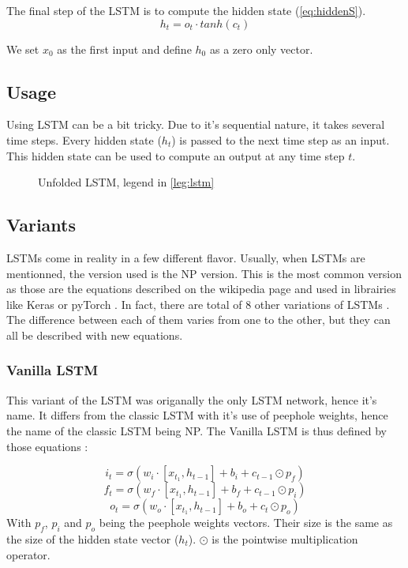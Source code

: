 The final step of the \ac{LSTM} is to compute the hidden state (\cref{eq:hiddenS}).
\begin{equation}\label{eq:hiddenS}
  h_t=o_t\cdot tanh(c_t)
\end{equation}

We set $x_0$ as the first input and define $h_0$ as a zero only vector.

\subsection{Usage}

Using \ac{LSTM} can be a bit tricky. Due to it's sequential nature, it takes several time steps. Every hidden state ($h_t$) is passed to the next time step as an input. This hidden state can be used to compute an output at any time step $t$.

\begin{figure}[H]
  \centering
  
  \caption{Unfolded \acs{LSTM}, legend in \cref{leg:lstm}}
  \label{fig:lstmUse}
\end{figure}

\subsection{Variants}

\acp{LSTM} come in reality in a few different flavor. Usually, when \acp{LSTM} are mentionned, the version used is the \ac{NP} version. This is the most common version as those are the equations described on the wikipedia page \cite{wikiLSTM} and used in librairies like Keras \cite{Keras} or pyTorch \cite{PyTorch}. In fact, there are total of 8 other variations of \acp{LSTM} \cite{nbLSTM}.
The difference between each of them varies from one to the other, but they can all be described with new equations.

\subsubsection{Vanilla \ac{LSTM}}
This variant of the \ac{LSTM} was origanally the only \ac{LSTM} network, hence it's name. It differs from the classic \ac{LSTM} with it's use of peephole weights, hence the name of the classic \ac{LSTM} being \acl{NP}. The Vanilla \ac{LSTM} is thus defined by those equations \cite{vanillaLSTM, nbLSTM} :

\begin{equation}\label{eq:inputGVanilla}
  i_t=\sigma (w_i\cdot[x_{t_1},h_{t-1}] + b_i+c_{t-1}\odot p_f)
\end{equation}
\begin{equation}\label{eq:forgetGVanilla}
  f_t=\sigma (w_f\cdot[x_{t_1},h_{t-1}] + b_f+c_{t-1}\odot p_i)
\end{equation}
\begin{equation}\label{eq:ouputGVanilla}
  o_t=\sigma (w_o\cdot[x_{t_1},h_{t-1}] + b_o+c_{t}\odot p_o)
\end{equation}
With $p_f$, $p_i$ and $p_o$ being the peephole weights vectors. Their size is the same as the size of the hidden state vector ($h_t$). $\odot$ is the pointwise multiplication operator.

